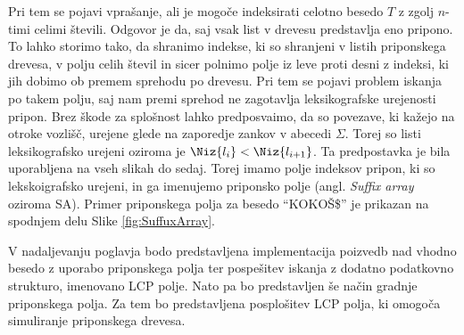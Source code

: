 Pri tem se pojavi vprašanje, ali je mogoče indeksirati celotno besedo $T$ z zgolj $n$-timi celimi števili. Odgovor je da, saj vsak list v drevesu predstavlja eno pripono. To lahko storimo tako, da shranimo indekse, ki so shranjeni v listih priponskega drevesa, v polju celih števil in sicer polnimo polje iz leve proti desni z indeksi, ki jih dobimo ob premem sprehodu po drevesu. Pri tem se pojavi problem iskanja po takem polju, saj nam premi sprehod ne zagotavlja leksikografske urejenosti pripon. Brez škode za splošnost lahko predposvaimo, da so povezave, ki kažejo na otroke vozlišč, urejene glede na zaporedje zankov v abecedi $\Sigma$. Torej so listi leksikografsko urejeni oziroma je $\Niz{l_i}<\Niz{l_{i+1}}$. Ta predpostavka je bila uporabljena na vseh slikah do sedaj. Torej imamo polje indeksov pripon, ki so lekskoigrafsko urejeni, in ga imenujemo priponsko polje (angl. \textit{Suffix array} oziroma SA). Primer priponskega polja za besedo \enquote{KOKOŠ\$} je prikazan na spodnjem delu Slike \ref{fig:SuffuxArray}. %



V nadaljevanju poglavja bodo predstavljena implementacija poizvedb nad vhodno besedo z uporabo priponskega polja ter pospešitev iskanja z dodatno podatkovno strukturo, imenovano LCP polje. Nato pa bo predstavljen še način gradnje priponskega polja. Za tem bo predstavljena posplošitev LCP polja, ki omogoča simuliranje priponskega drevesa. 




